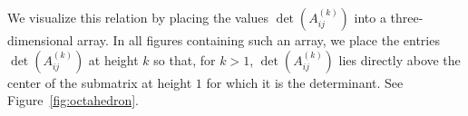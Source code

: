 \documentclass[ALCO,Unicode,published]{cedram}
\numberwithin{equation}{section}
\begin{document}
We visualize this relation by placing the values $\det(A_{ij}^{(k)})$ into a three-dimensional array. In all figures containing such an array, we place the entries $\det(A_{ij}^{(k)})$ at height $k$ so that, for $k>1$, $\det(A_{ij}^{(k)})$ lies directly above the center of the submatrix at height $1$ for which it is the determinant. See Figure~\ref{fig:octahedron}.







\end{document}

